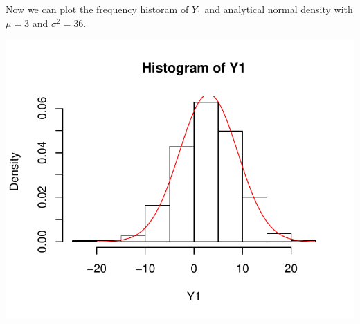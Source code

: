 \documentclass[12pt, a4paper]{article}\usepackage[]{graphicx}\usepackage[]{color}
\makeatletter
\def\maxwidth{ %
  \ifdim\Gin@nat@width>\linewidth
    \linewidth
  \else
    \Gin@nat@width
  \fi
}
\newenvironment{knitrout}{}{} %
\makeatother
\begin{document}
Now we can plot the frequency historam of $Y_1$ and analytical normal density with $\mu=3$ and $\sigma^2=36$.
\begin{knitrout}
\color{fgcolor}

{\centering \includegraphics[width=\maxwidth]{figure/ex1_1hist-1} 

}



\end{knitrout}
\end{document}
